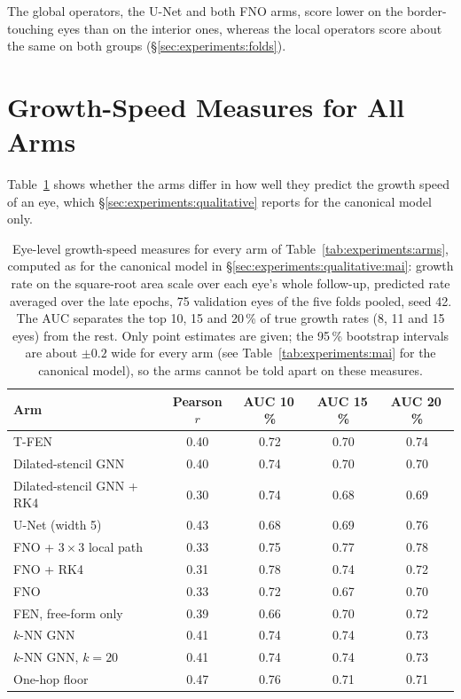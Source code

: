 The global operators, the U-Net and both FNO arms, score lower on the
border-touching eyes than on the interior ones, whereas the local
operators score about the same on both groups
(\S\ref{sec:experiments:folds}).

\clearpage
\section{Growth-Speed Measures for All Arms}
\label{app:full-results:growth-speed}

Table~\ref{tab:appendix:growth-speed} shows whether the arms differ in how
well they predict the growth speed of an eye, which
\S\ref{sec:experiments:qualitative} reports for the canonical model only.

\begin{table}[!h]
  \centering
  \caption[Growth-speed measures for all arms.]{%
    Eye-level growth-speed measures for every arm of
    Table~\ref{tab:experiments:arms}, computed as for the canonical model in
    \S\ref{sec:experiments:qualitative:mai}: growth rate on the square-root
    area scale over each eye's whole follow-up, predicted rate averaged over
    the late epochs, 75 validation eyes of the five folds pooled, seed 42.
    The AUC separates the top 10, 15 and 20\,\% of true growth rates (8, 11
    and 15 eyes) from the rest. Only point estimates are given; the 95\,\%
    bootstrap intervals are about $\pm 0.2$ wide for every arm (see
    Table~\ref{tab:experiments:mai} for the canonical model), so the arms
    cannot be told apart on these measures.}
  \label{tab:appendix:growth-speed}
  \small
  \begin{tabular}{l c c c c}
    \toprule
    Arm & Pearson $r$ & AUC 10\,\% & AUC 15\,\% & AUC 20\,\% \\
    \midrule
    T-FEN                            & 0.40 & 0.72 & 0.70 & 0.74 \\
    Dilated-stencil GNN              & 0.40 & 0.74 & 0.70 & 0.70 \\
    Dilated-stencil GNN + RK4        & 0.30 & 0.74 & 0.68 & 0.69 \\
    U-Net (width 5)                  & 0.43 & 0.68 & 0.69 & 0.76 \\
    FNO + $3 \times 3$ local path    & 0.33 & 0.75 & 0.77 & 0.78 \\
    FNO + RK4                        & 0.31 & 0.78 & 0.74 & 0.72 \\
    FNO                              & 0.33 & 0.72 & 0.67 & 0.70 \\
    FEN, free-form only              & 0.39 & 0.66 & 0.70 & 0.72 \\
    $k$-NN GNN                       & 0.41 & 0.74 & 0.74 & 0.73 \\
    $k$-NN GNN, $k = 20$             & 0.41 & 0.74 & 0.74 & 0.73 \\
    One-hop floor                    & 0.47 & 0.76 & 0.71 & 0.71 \\
    \bottomrule
  \end{tabular}
\end{table}
